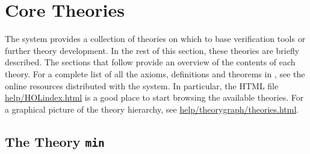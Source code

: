 \chapter{Core Theories}\label{HOLtheories}

%



\setcounter{sessioncount}{0}


\newcommand{\konst}[1]{\ensuremath{\mbox{\small{\textbf{\sf{#1}}}}}}
\newcommand{\nil}{\mathbf{[} \;\mathbf{]}}
\newcommand{\cons}[2]{{#1}\mathbf{:}\mathbf{:}{#2}}

%
The \HOL{} system provides a collection of theories on which to base verification tools or further theory development.
In the rest of this section, these theories are briefly described.
The sections that follow provide an overview of the contents of each theory.
For a complete list of all the axioms, definitions and theorems in \HOL, see the online resources distributed with the system.
In particular, the HTML file \url{help/HOLindex.html} is a good place to start browsing the available theories.
For a graphical picture of the theory hierarchy, see \url{help/theorygraph/theories.html}.

\section{The Theory {\tt min}}\label{minTheory}

